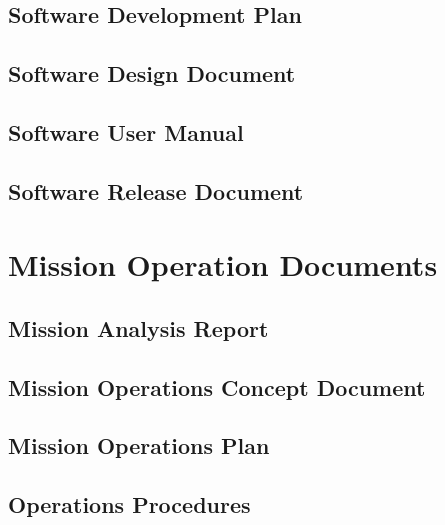 \subsection{Software Development Plan}
\label{app:Software Development Plan}


\subsection{Software Design Document}
\label{app:Software Design Document}


\subsection{Software User Manual}
\label{app:Software User Manual}


\subsection{Software Release Document}
\label{sec:Software Release Document}

\clearpage
\section{Mission Operation Documents}


\subsection{Mission Analysis Report}
\label{sec:Mission Analysis Report}


\subsection{Mission Operations Concept Document}
\label{sec:Mission Operations Concept Document}


\subsection{Mission Operations Plan}
\label{sec:Mission Operations Plan}


\subsection{Operations Procedures}
\label{sec:Operations Procedures}


